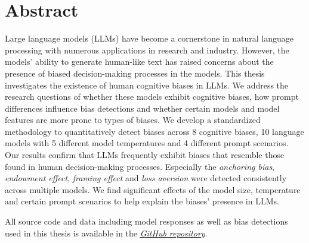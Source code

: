 \section*{Abstract}
\par Large language models (LLMs) have become a cornerstone in natural language processing with numerous applications in research and industry. However, the models' ability to generate human-like text has raised concerns about the presence of biased decision-making processes in the models. This thesis investigates the existence of human cognitive biases in LLMs. We address the research questions of whether these models exhibit cognitive biases, how prompt differences influence bias detections and whether certain models and model features are more prone to types of biases. We develop a standardized methodology to quantitatively detect biases across 8 cognitive biases, 10 language models with 5 different model temperatures and 4 different prompt scenarios. Our results confirm that LLMs frequently exhibit biases that resemble those found in human decision-making processes. Especially the \textit{anchoring bias}, \textit{endowment effect}, \textit{framing effect} and \textit{loss aversion} were detected consistently across multiple models. We find significant effects of the model size, temperature and certain prompt scenarios to help explain the biases' presence in LLMs.

\vfill
\begin{flushbottom}
\par All source code and data including model responses as well as bias detections used in this thesis is available in the 
\href{https://github.com/maxjmohr/MSc_04_Master_Thesis}{\textit{GitHub repository}}.
\end{flushbottom}
